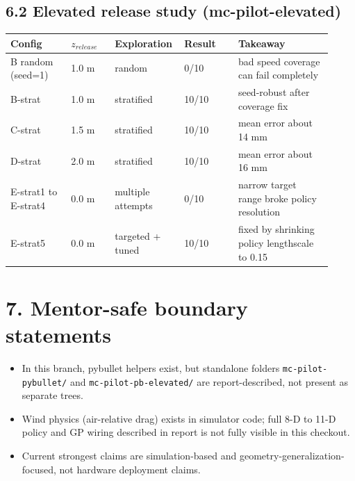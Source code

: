 \documentclass[11pt]{article}
\begin{document}
\subsection*{6.2 Elevated release study (mc-pilot-elevated)}
\begin{longtable}{p{0.18\linewidth} p{0.13\linewidth} p{0.16\linewidth} p{0.16\linewidth} p{0.29\linewidth}}
\toprule
\textbf{Config} & \textbf{$z_{release}$} & \textbf{Exploration} & \textbf{Result} & \textbf{Takeaway} \\
\midrule
B random (seed=1) & 1.0 m & random & 0/10 & bad speed coverage can fail completely \\
B-strat & 1.0 m & stratified & 10/10 & seed-robust after coverage fix \\
C-strat & 1.5 m & stratified & 10/10 & mean error about 14 mm \\
D-strat & 2.0 m & stratified & 10/10 & mean error about 16 mm \\
E-strat1 to E-strat4 & 0.0 m & multiple attempts & 0/10 & narrow target range broke policy resolution \\
E-strat5 & 0.0 m & targeted + tuned & 10/10 & fixed by shrinking policy lengthscale to 0.15 \\
\bottomrule
\end{longtable}

\section*{7. Mentor-safe boundary statements}
\begin{itemize}
\item In this branch, pybullet helpers exist, but standalone folders \texttt{mc-pilot-pybullet/} and \texttt{mc-pilot-pb-elevated/} are report-described, not present as separate trees.
\item Wind physics (air-relative drag) exists in simulator code; full 8-D to 11-D policy and GP wiring described in report is not fully visible in this checkout.
\item Current strongest claims are simulation-based and geometry-generalization-focused, not hardware deployment claims.
\end{itemize}
\end{document}
